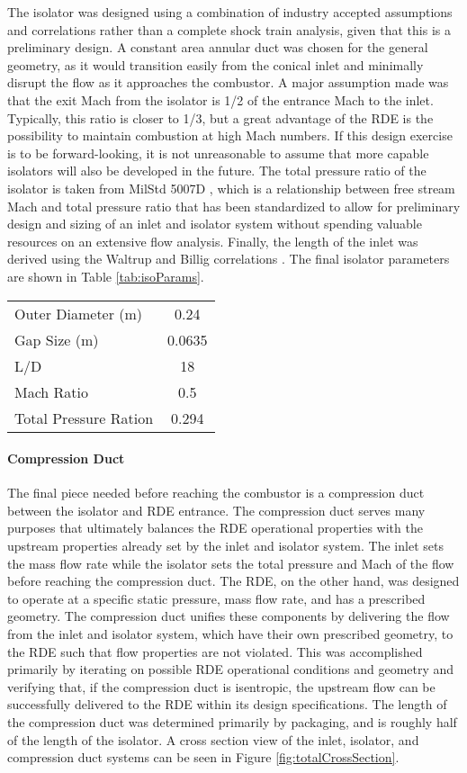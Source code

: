     The isolator was designed using a combination of industry accepted assumptions and correlations rather than a complete shock train analysis, given that this is a preliminary design. A constant area annular duct was chosen for the general geometry, as it would transition easily from the conical inlet and minimally disrupt the flow as it approaches the combustor. 
A major assumption made was that the exit Mach from the isolator is 1/2 of the entrance Mach to the inlet. Typically, this ratio is closer to 1/3, but a great advantage of the RDE is the possibility to maintain combustion at high Mach numbers. If this design exercise is to be forward-looking, it is not unreasonable to assume that more capable isolators will also be developed in the future. 
    The total pressure ratio of the isolator is taken from MilStd 5007D \cite{milstd5007D}, which is a relationship between free stream Mach and total pressure ratio that has been standardized to allow for preliminary design and sizing of an inlet and isolator system without spending valuable resources on an extensive flow analysis. Finally, the length of the inlet was derived using the Waltrup and Billig correlations \cite{waltrup}. The final isolator parameters are shown in Table \ref{tab:isoParams}.

\begin{center}
\begin{tabular}{l c}
Outer Diameter (m) & 0.24\\
Gap Size (m) & 0.0635\\
L/D  & 18 \\
Mach Ratio & 0.5 \\
Total Pressure Ration & 0.294
\end{tabular}
\label{tab:isoParams}
\end{center}

\paragraph{Compression Duct}

    The final piece needed before reaching the combustor is a compression duct between the isolator and RDE entrance. The compression duct serves many purposes that ultimately balances the RDE operational properties with the upstream properties already set by the inlet and isolator system. The inlet sets the mass flow rate while the isolator sets the total pressure and Mach of the flow before reaching the compression duct. The RDE, on the other hand, was designed to operate at a specific static pressure, mass flow rate, and has a prescribed geometry. The compression duct unifies these components by delivering the flow from the inlet and isolator system, which have their own prescribed geometry, to the RDE such that flow properties are not violated. This was accomplished primarily by iterating on possible RDE operational conditions and geometry and verifying that, if the compression duct is isentropic, the upstream flow can be successfully delivered to the RDE within its design specifications. The length of the compression duct was determined primarily by packaging, and is roughly half of the length of the isolator. A cross section view of the inlet, isolator, and compression duct systems can be seen in Figure \ref{fig:totalCrossSection}.
